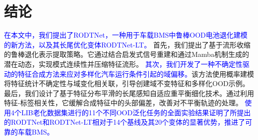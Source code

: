 \documentclass[UTF8,lettersize,journal]{IEEEtran}
\newcommand{\rev}[1]{\textcolor{blue}{#1}}
\begin{document}
\section{结论}

\rev{在本文中，我们提出了RODTNet，一种用于车载BMS中鲁棒OOD电池退化建模的新方法，以及其长尾优化变体RODTNet-LT。}
% 
首先，我们提出了基于流形收缩的鲁棒退化表示提取策略。它通过结合启发式信号重建和通过Mamba机制生成的潜在动态，实现模式连续性并压缩特征流形。
% 
\rev{其次，我们开发了一种不确定性驱动的特征合成方法来应对多样化汽车运行条件引起的域偏移。}该方法使用概率建模将特征统计不确定性与域变化相关联，引导创建域不变特征和多样化OOD示例。
% 
最后，我们设计了基于特征分布平滑的长尾感知自适应重平衡细化技术。通过利用特征-标签相关性，它缓解合成特征中的头部偏差，改善对不平衡轨迹的处理。
% 
\rev{使用4个LIB老化数据集进行的11个不同OOD泛化任务的全面实验结果证明了所提出的RODTNet和RODTNet-LT相对于14个基线及其20个变体的显著优势，推进了可靠的车载BMS。}






 


\end{document}
